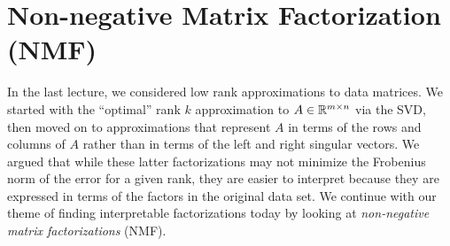 \documentclass[12pt, leqno]{article} %
\begin{document}

\section{Non-negative Matrix Factorization (NMF)}

In the last lecture, we considered low rank approximations to data
matrices.  We started with the ``optimal'' rank $k$ approximation
to $A \in \mathbb{R}^{m \times n}$ via the SVD, then moved on to
approximations that represent $A$ in terms of the rows and columns of
$A$ rather than in terms of the left and right singular vectors.
We argued that while these latter factorizations may not minimize the
Frobenius norm of the error for a given rank, they are easier to
interpret because they are expressed in terms of the factors in the
original data set.  We continue with our theme of finding
interpretable factorizations today by looking at
{\em non-negative matrix factorizations} (NMF).
\end{document}

